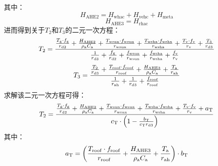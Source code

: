 其中：
\begin{equation}
  H_{\mathrm{AHE2}} = H_{\mathrm{whac}} + H_{\mathrm{vehc}} + H_{\mathrm{meta}}
\end{equation}
%
\begin{equation}
  H_{\mathrm{AHE3}} = H_{\mathrm{rhac}}
\end{equation}
进而得到关于$T_{2}$和$T_{3}$的二元一次方程：
\begin{equation}
  \begin{split}
    T_{2} =
    \frac{\frac{T_{\mathrm{g}} \cdot f_{\mathrm{g}}}{r_{\mathrm{d2}}} + \frac{H_{\mathrm{AHE2}}}{\rho _{\rm a} C_{\mathrm a}} + \frac{T_{\mathrm{wsun}} \cdot f_{\mathrm{wsun}}}{r_{\mathrm{wsun}}} + \frac{T_{\mathrm{wsha}} \cdot f_{\mathrm{wsha}}}{r_{\mathrm{wsha}}} + \frac{T_{\mathrm{v}} \cdot f_{\rm v}}{r_{\mathrm{v}}} + \frac{T_{3}}{r_{\mathrm{d3}}}}{\frac{1}{r_{\mathrm{d3}}} + \frac{f_{\mathrm{g}}}{r_{\mathrm{d2}}} + \frac{f_{\mathrm{wsun}}}{r_{\mathrm{wsun}}} + \frac{f_{\mathrm{wsha}}}{r_{\mathrm{wsha}}} + \frac{f_{\rm v}}{r_{\mathrm{v}}}}
  \end{split}
\end{equation}
%
\begin{equation}\label{result_T_layer3}
  T_{3} = \frac{\frac{T_{2}}{r_{\mathrm{d3}}} + \frac{T_{\mathrm{roof}} \cdot f_{\mathrm{roof}}}{r_{\mathrm{roof}}} + \frac{H_{\mathrm{AHE3}}}{\rho _{\rm a} C_{\mathrm a}} + \frac{T_{\rm a}}{r_{\mathrm{ah}}}}{\frac{1}{r_{\mathrm{ah}}} + \frac{1}{r_{\mathrm{d3}}} + \frac{f_{\mathrm{roof}}}{r_{\mathrm{roof}}}}
\end{equation}
求解该二元一次方程可得：
\begin{equation}
  \begin{split}
    T_{2} =
    \frac{\frac{T_{\mathrm{g}} \cdot f_{\mathrm{g}}}{r_{\mathrm{d2}}} + \frac{H_{\mathrm{AHE2}}}{\rho _{\rm a} C_{\mathrm a}} + \frac{T_{\mathrm{wsun}} \cdot f_{\mathrm{wsun}}}{r_{\mathrm{wsun}}} + \frac{T_{\mathrm{wsha}} \cdot f_{\mathrm{wsha}}}{r_{\mathrm{wsha}}} + \frac{T_{\mathrm{v}} \cdot f_{\mathrm{v}}}{r_{\mathrm{v}}} + a_{\mathrm{T}}}{c_{\mathrm{T}} \cdot \left( 1 - \frac{b_{\mathrm {T}} }{c_{\mathrm{T}} r_{\mathrm{d3}}} \right)}
  \end{split}
\end{equation}
%
其中：
\begin{equation}
  a_{\mathrm{T}} = \left(\frac{T_{\mathrm{roof}} \cdot f_{\mathrm{roof}}}{r_{\mathrm{roof}}} + \frac{H_{\mathrm{AHE3}}}{\rho _{\rm a} C_{\mathrm a}} + \frac{T_{\rm a}}{r_{\mathrm{ah}}}\right) \cdot b_{\mathrm{T}}
\end{equation}
